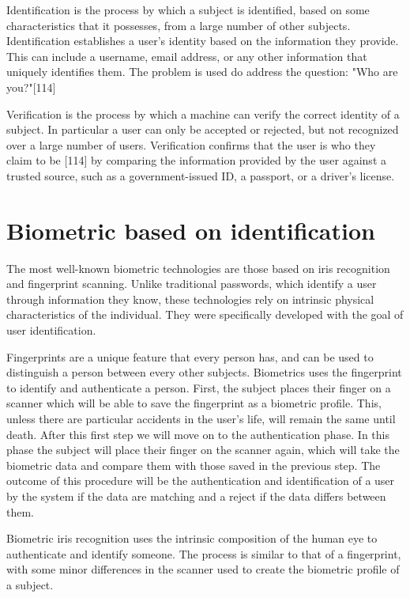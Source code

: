 \documentclass[12pt]{report}
\begin{document}
Identification is the process by which a subject is identified, based on some characteristics that it possesses, from a large number of other subjects.
Identification establishes a user's identity based on the information they provide. 
This can include a username, email address, or any other information that uniquely identifies them.
The problem is used do address the question: "Who are you?"[114]

Verification is the process by which a machine can verify the correct identity of a subject.
In particular a user can only be accepted or rejected, but not recognized over a large number of users.
Verification confirms that the user is who they claim to be [114] by comparing the information provided by the user against a trusted source, such as a government-issued ID, a passport, or a driver's license.


\section{Biometric based on identification}

The most well-known biometric technologies are those based on iris recognition and fingerprint scanning. 
Unlike traditional passwords, which identify a user through information they know, these technologies rely on intrinsic physical characteristics of the individual.
They were specifically developed with the goal of user identification.

Fingerprints are a unique feature that every person has, and can be used to distinguish a person between every other subjects. 
Biometrics uses the fingerprint to identify and authenticate a person.
First, the subject places their finger on a scanner which will be able to save the fingerprint as a biometric profile.
This, unless there are particular accidents in the user's life, will remain the same until death.
After this first step we will move on to the authentication phase.
In this phase the subject will place their finger on the scanner again, which will take the biometric data and compare them with those saved in the previous step.
The outcome of this procedure will be the authentication and identification of a user by the system if the data are matching and a reject if the data differs between them.

Biometric iris recognition uses the intrinsic composition of the human eye to authenticate and identify someone.
The process is similar to that of a fingerprint, with some minor differences in the scanner used to create the biometric profile of a subject.
\end{document}
